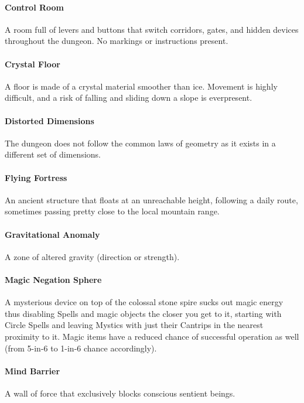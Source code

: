 \documentclass[itdr]{subfiles}
\begin{document}
\paragraph{Control Room}
A room full of levers and buttons that switch corridors, gates, and hidden devices throughout the dungeon. No markings or instructions present.

\vfill
\paragraph{Crystal Floor}
A floor is made of a crystal material smoother than ice. Movement is highly difficult, and a risk of falling and sliding down a slope is everpresent.

\vfill
\paragraph{Distorted Dimensions}
The dungeon does not follow the common laws of geometry as it exists in a different set of dimensions.

\vfill
\paragraph{Flying Fortress}
An ancient structure that floats at an unreachable height, following a daily route, sometimes passing pretty close to the local mountain range.

\vfill
\paragraph{Gravitational Anomaly}
A zone of altered gravity (direction or strength).

\vfill
\paragraph{Magic Negation Sphere}
A mysterious device on top of the colossal stone spire sucks out magic energy thus disabling Spells and magic objects the closer you get to it, starting with  Circle Spells and leaving Mystics with just their Cantrips in the nearest proximity to it. Magic items have a reduced chance of successful operation as well (from 5-in-6 to 1-in-6 chance accordingly).

\vfill
\paragraph{Mind Barrier}
A wall of force that exclusively blocks conscious sentient beings.
\end{document}

